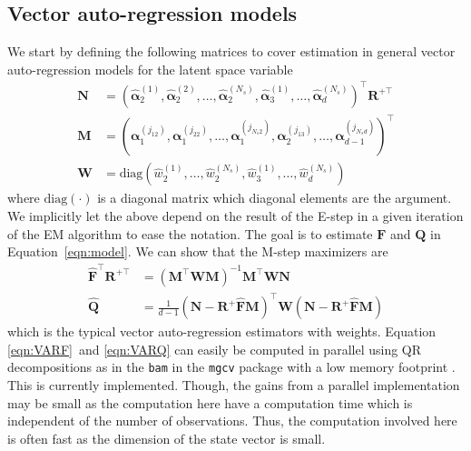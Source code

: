 \documentclass[notitlepage]{article}
\renewcommand{\vec}[1]{\bm{#1}}
\newcommand{\mat}[1]{\mathbf{#1}}
\newcommand{\Lparen}[1]{\left( #1\right)}
\newcommand{\optor}[2]{#1\Lparen{#2}}
\newcommand{\diag}[1]{\optor{\text{diag}}{#1}}
\newcommand{\partic}[3]{#1_{#2}^{\Lparen{#3}}}
\newcommand{\particS}[3]{\widehat{#1}_{#2}^{\Lparen{#3}}}
\newcommand{\nPart}{N}
\newcommand{\nPeriods}{d}
\begin{document}
\subsection{Vector auto-regression models}\label{subsec:VAR}
We start by defining the following matrices to cover estimation in general vector auto-regression models for the latent space variable %
%
\begin{align*}
\mat{N} &= \Lparen{
    	\particS{\vec{\alpha}}{2}{1}, 
    	\particS{\vec{\alpha}}{2}{2},
    	\dots, 
    	\particS{\vec{\alpha}}{2}{\nPart_s}, 
    	\particS{\vec{\alpha}}{3}{1},
    	\dots, 
   		\particS{\vec{\alpha}}{\nPeriods}{\nPart_s}
	}^\top\mat{R}^{+\top} \\
%
\mat{M} &= \Lparen{
    	\partic{\vec{\alpha}}{1}{j_{12}}, 
    	\partic{\vec{\alpha}}{1}{j_{22}},
    	\dots, 
    	\partic{\vec{\alpha}}{1}{j_{\nPart_s2}}, 
    	\partic{\vec{\alpha}}{2}{j_{13}},
    	\dots, 
   		\partic{\vec{\alpha}}{\nPeriods - 1}{j_{\nPart_s\nPeriods}}
	}^\top \\
%
\mat{W} &= \diag{
		\particS{w}{2}{1}, \dots, \particS{w}{2}{\nPart_s},
		\particS{w}{3}{1}, \dots,
		\particS{w}{\nPeriods}{\nPart_s}
	}
\end{align*}%
% 
where $\diag{\cdot}$ is a diagonal matrix which diagonal elements are the argument. We implicitly let the above depend on the result of the E-step in a given iteration of the EM algorithm to ease the notation. The goal is to estimate $\mat{F}$ and $\mat{Q}$ in Equation~\eqref{eqn:model}. We can 
 show that the M-step maximizers are%
% 
\begin{align}
\widehat{\mat{F}}^\top\mat{R}^{+\top} &=
	\Lparen{\mat{M}^\top\mat{W}\mat{M}}^{-1}	
	\mat{M}^\top\mat{W}\mat{N} \label{eqn:VARF} \\
%
\widehat{\mat{Q}} &= 
	\frac{1}{\nPeriods - 1}
	\Lparen{\mat{N} - \mat{R}^+\widehat{\mat{F}}\mat{M}}^\top
	\mat{W}
	\Lparen{\mat{N} - \mat{R}^+\widehat{\mat{F}}\mat{M}} \label{eqn:VARQ}
\end{align}%
%
which is the typical vector auto-regression estimators with weights. Equation \eqref{eqn:VARF}~and \eqref{eqn:VARQ} can easily be computed in parallel using QR decompositions as in the \texttt{bam} in the \texttt{mgcv} package with a low memory footprint \citep[see][]{wood14}. This is currently implemented. Though, the gains from a parallel implementation may be small as the computation here have a computation time which is independent of the number of observations. Thus, the computation involved here is often fast
as the dimension of the state vector is small.
\end{document}
